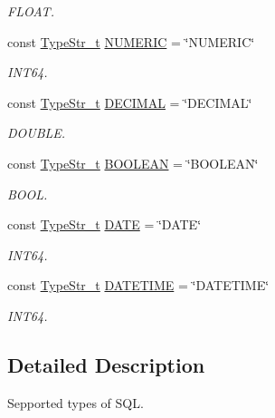 \begin{DoxyCompactItemize}
\begin{DoxyCompactList}\small\item\em F\+L\+O\+AT. \end{DoxyCompactList}\item 
\mbox{\label{namespacesf_1_1sql__types_a6b9c0c43cc21f3123ff4c3e2109df5fd}} 
const \hyperlink{namespacesf_1_1sql__types_a1a4f114cdf79706d2298e3454006e65b}{Type\+Str\+\_\+t} \hyperlink{namespacesf_1_1sql__types_a6b9c0c43cc21f3123ff4c3e2109df5fd}{N\+U\+M\+E\+R\+IC} = \char`\"{}N\+U\+M\+E\+R\+IC\char`\"{}
\begin{DoxyCompactList}\small\item\em I\+N\+T64. \end{DoxyCompactList}\item 
\mbox{\label{namespacesf_1_1sql__types_a696038719ab0f7c871d2e45eb39b5138}} 
const \hyperlink{namespacesf_1_1sql__types_a1a4f114cdf79706d2298e3454006e65b}{Type\+Str\+\_\+t} \hyperlink{namespacesf_1_1sql__types_a696038719ab0f7c871d2e45eb39b5138}{D\+E\+C\+I\+M\+AL} = \char`\"{}D\+E\+C\+I\+M\+AL\char`\"{}
\begin{DoxyCompactList}\small\item\em D\+O\+U\+B\+LE. \end{DoxyCompactList}\item 
\mbox{\label{namespacesf_1_1sql__types_a5b2d60e3422b5c1363371fe10a54350a}} 
const \hyperlink{namespacesf_1_1sql__types_a1a4f114cdf79706d2298e3454006e65b}{Type\+Str\+\_\+t} \hyperlink{namespacesf_1_1sql__types_a5b2d60e3422b5c1363371fe10a54350a}{B\+O\+O\+L\+E\+AN} = \char`\"{}B\+O\+O\+L\+E\+AN\char`\"{}
\begin{DoxyCompactList}\small\item\em B\+O\+OL. \end{DoxyCompactList}\item 
\mbox{\label{namespacesf_1_1sql__types_a04cb73933d5bd79b9957524fbe4f44d5}} 
const \hyperlink{namespacesf_1_1sql__types_a1a4f114cdf79706d2298e3454006e65b}{Type\+Str\+\_\+t} \hyperlink{namespacesf_1_1sql__types_a04cb73933d5bd79b9957524fbe4f44d5}{D\+A\+TE} = \char`\"{}D\+A\+TE\char`\"{}
\begin{DoxyCompactList}\small\item\em I\+N\+T64. \end{DoxyCompactList}\item 
\mbox{\label{namespacesf_1_1sql__types_a1ecb434407c9e3193f45b1cf184d888a}} 
const \hyperlink{namespacesf_1_1sql__types_a1a4f114cdf79706d2298e3454006e65b}{Type\+Str\+\_\+t} \hyperlink{namespacesf_1_1sql__types_a1ecb434407c9e3193f45b1cf184d888a}{D\+A\+T\+E\+T\+I\+ME} = \char`\"{}D\+A\+T\+E\+T\+I\+ME\char`\"{}
\begin{DoxyCompactList}\small\item\em I\+N\+T64. \end{DoxyCompactList}\end{DoxyCompactItemize}


\subsection{Detailed Description}
Sepported types of S\+QL. 